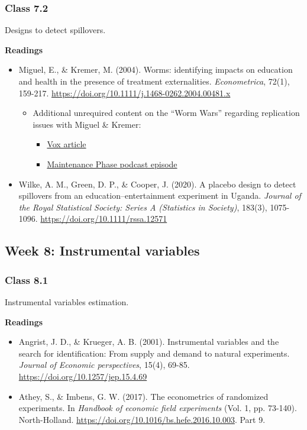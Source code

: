 \documentclass[letterpaper,12pt,parskip=full,DIV=10]{scrartcl}
\newcommand{\courseweek}[2]{\Needspace{12\baselineskip}\subsection*{Week #1: #2}}
\newcommand{\class}[2]{\Needspace{9\baselineskip}\subsubsection*{Class #1}\nopagebreak #2\par\nopagebreak\textbf{Readings}\par\nopagebreak}
\begin{document}
\class{7.2}{Designs to detect spillovers.}

\begin{itemize}

\item Miguel, E., \& Kremer, M. (2004). Worms: identifying impacts on education and health in the presence of treatment externalities. \emph{Econometrica}, 72(1), 159-217. \url{https://doi.org/10.1111/j.1468-0262.2004.00481.x}

\begin{itemize}

\item Additional unrequired content on the ``Worm Wars'' regarding replication issues with Miguel \& Kremer:

\begin{itemize}

\item \href{https://www.vox.com/2015/7/24/9031909/worm-wars-explained}{Vox article}

\item \href{https://open.spotify.com/episode/7ujpdCPK5hKPgUYDGV87aV?si=nmXeJSqnR0aRlF5S3gMP9g}{Maintenance Phase podcast episode}

\end{itemize}

\end{itemize}

\item Wilke, A. M., Green, D. P., \& Cooper, J. (2020). A placebo design to detect spillovers from an education--entertainment experiment in Uganda. \emph{Journal of the Royal Statistical Society: Series A (Statistics in Society)}, 183(3), 1075-1096. \url{https://doi.org/10.1111/rssa.12571}

\end{itemize}

\courseweek{8}{Instrumental variables}

\class{8.1}{Instrumental variables estimation.}

\begin{itemize}

\item Angrist, J. D., \& Krueger, A. B. (2001). Instrumental variables and the search for identification: From supply and demand to natural experiments. \emph{Journal of Economic perspectives}, 15(4), 69-85. \url{https://doi.org/10.1257/jep.15.4.69}

\item Athey, S., \& Imbens, G. W. (2017). The econometrics of randomized experiments. In \emph{Handbook of economic field experiments} (Vol. 1, pp. 73-140). North-Holland. \url{https://doi.org/10.1016/bs.hefe.2016.10.003}. Part 9.

\end{itemize}
\end{document}

